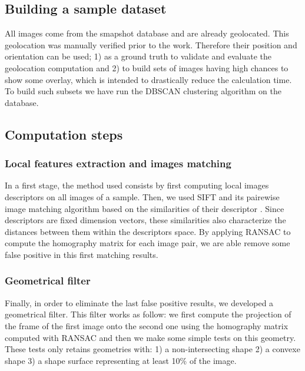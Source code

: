 \documentclass[fleqn,10pt,lineno]{wlpeerj} %
\begin{document}
\subsection*{Building a sample dataset}
All images come from the smapshot database and are already geolocated. 
This geolocation was manually verified prior to the work. 
Therefore their position and orientation can be used; 
1) as a ground truth to  validate and evaluate the geolocation computation and 
2) to build sets of images having high chances to show some overlay, 
which is intended to drastically reduce the calculation time. 
To build such subsets we have run  the DBSCAN clustering algorithm 
\citep{ester1996} on the database.

\subsection*{Computation steps}


\subsubsection*{Local features extraction and images matching}
In a first stage, 
the method used consists by first computing local images descriptors on all 
images of a sample. 
Then, we used SIFT and its pairewise image matching algorithm based on the 
similarities of their descriptor \citep{lowe1999}. 
Since descriptors are fixed dimension vectors, these similarities also characterize 
the distances between them within the descriptors space. 
By applying RANSAC \citep{fischler1981} to compute the homography matrix for each 
image pair, we are able remove some false positive in this first matching results.
 

\subsubsection*{Geometrical filter}
Finally, in order to eliminate the last false positive results, we developed 
a geometrical filter.
This filter works as follow: we first compute the projection of the frame of the first
image onto the second one using the  homography matrix computed with RANSAC and then
we make some simple tests on this geometry. These tests only retains geometries with:
1) a non-intersecting shape
2) a convexe shape
3) a shape surface representing at least 10\% of the image.

\end{document}
